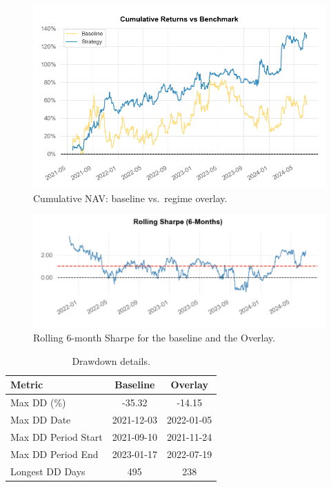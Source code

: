 \begin{figure}[t]
\centering
\includegraphics[width=0.9\linewidth]{headline_plots/NAV.png}%
\caption{Cumulative NAV: baseline vs.\ regime overlay.}
\label{fig:nav}
\end{figure}

\begin{figure}[t]
\centering
\includegraphics[width=0.9\linewidth]{headline_plots/Rolling_Sharp.png}
\caption{Rolling 6-month Sharpe for the baseline and the Overlay.}
\label{fig:roll_sharpe_6m}
\end{figure}


\begin{table}[t]
\centering
\caption{Drawdown details.}
\label{tab:diag_dd}
\small
\begin{tabular}{lcc}
\toprule
Metric & Baseline & Overlay \\
\midrule
Max DD (\%)          & -35.32 & -14.15 \\
Max DD Date          & 2021-12-03 & 2022-01-05 \\
Max DD Period Start  & 2021-09-10 & 2021-11-24 \\
Max DD Period End    & 2023-01-17 & 2022-07-19 \\
Longest DD Days      & 495 & 238 \\
\bottomrule
\end{tabular}
\end{table}


